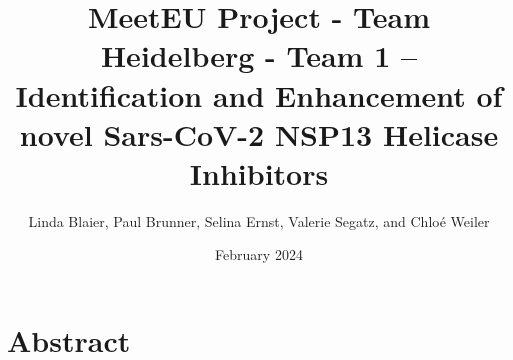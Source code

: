 \documentclass[11pt, letterpaper, titlepage]{article}
\title{MeetEU Project - Team Heidelberg - Team 1 -- \\ Identification and Enhancement of novel Sars-CoV-2 NSP13 Helicase Inhibitors}
\author{Linda Blaier, Paul Brunner, Selina Ernst, Valerie Segatz, and Chlo\'{e} Weiler}
\date{February 2024}
\begin{document}
\maketitle

\ihead{\headmark}
\cfoot{\pagemark}   %

\section{Abstract}

\end{document}
